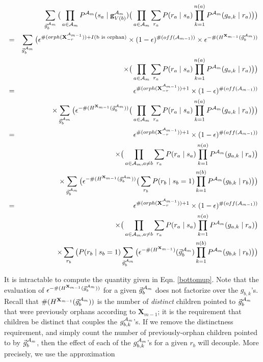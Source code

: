 \documentclass[11pt]{article}
\newcommand{\A}{{\cal A}}
\newcommand{\X}{\mathbf{X}}
\newcommand{\XrmPrev}{\X^{\A_{m-1}}_{-r}}
\newcommand{\Am}{\A_{m}}
\begin{document}
\begin{eqnarray}
& &\sum_{\vec{g}^{\Am}_{b}} \big( \prod_{a \in {\Am}} P^{\Am}(s_a \mid \mathbf{g}^{\Am}_{V({b})})  \big( \prod_{a \in {\A_{m}}} \sum_{r_a} P(r_a \mid s_a) \prod_{k=1}^{n(a)} P^{\Am}(g_{a,k} \mid r_a) \big) \big ) \\
%
&=& \sum_{\vec{g}^{\Am}_{b}} \big(\epsilon^{\#(orph(\XrmPrev)) + I(\text{b is orphan})} \times (1-\epsilon)^{\#(off(\A_{m-1}))} \times \epsilon^{- \#(H^{\X_{m-1}}(\vec{g}_b^{\Am}))}  \nonumber \\
& & \times \big( \prod_{a \in {\A_{m}}} \sum_{r_a} P(r_a \mid s_a) \prod_{k=1}^{n(a)} P^{\Am}(g_{a,k} \mid r_a) \big) \big) \\
%
&=& \epsilon^{\#(orph(\XrmPrev)) + 1} \times (1-\epsilon)^{\#(off(\A_{m-1}))} \nonumber \\
& & \times  \sum_{\vec{g}^{\Am}_{b}} \big( \epsilon^{- \#(H^{\X_{m-1}}(\vec{g}_b^{\Am}))}  \big( \prod_{a \in {\A_{m}}} \sum_{r_a} P(r_a \mid s_a) \prod_{k=1}^{n(a)} P^{\Am}(g_{a,k} \mid r_a) \big) \big) \\
%
&=& \epsilon^{\#(orph(\XrmPrev)) + 1} \times (1-\epsilon)^{\#(off(\A_{m-1}))} \nonumber \\
& &\times  \big( \prod_{a \in {\A_{m}}, a \neq b} \sum_{r_a} P(r_a \mid s_a) \prod_{k=1}^{n(a)} P^{\Am}(g_{a,k} \mid r_a) \big) \\
& & \times \sum_{\vec{g}^{\Am}_{b}} \big( \epsilon^{- \#(H^{\X_{m-1}}(\vec{g}_b^{\Am}))} \big( \sum_{r_b} P(r_b \mid s_b = 1) \prod_{k=1}^{n(b)} P^{\Am}(g_{b,k} \mid r_b) \big) \big) \nonumber \\
%
&=& \epsilon^{\#(orph(\XrmPrev)) + 1} \times (1-\epsilon)^{\#(off(\A_{m-1}))} \nonumber \\
& & \times \big( \prod_{a \in {\A_{m}}, a \neq b} \sum_{r_a} P(r_a \mid s_a) \prod_{k=1}^{n(a)} P^{\Am}(g_{a,k} \mid r_a) \big) \label{bottomup} \\
& & \times \sum_{r_b} \big(P(r_b \mid s_b = 1) \sum_{\vec{g}^{\Am}_{b}} \big( \epsilon^{-\#(H^{\X_{m-1}})}(\vec{g}^{\Am}_b) \prod_{k=1}^{n(b)} P^{\Am}(g_{b,k} \mid r_b) \big) \big) \nonumber
\end{eqnarray} 

It is intractable to compute the quantity given in Eqn. \ref{bottomup}. Note that the evaluation of $\epsilon^{-\#(H^{\X_{m-1}}(\vec{g}^{\Am}_b))}$ for a given $\vec{g}^{\Am}_{b}$ does not factorize over the $g_{b,k}$'s. Recall that $\#(H^{\X_{m-1}}(\vec{g}^{\Am}_b))$ is the number of \emph{distinct} children pointed to $\vec{g}^{\Am}_b$ that were previously orphans according to $\X_{m-1}$; it is the requirement that children be distinct that couples the $g^{\Am}_{b,k}$'s. If we remove the distinctness requirement, and simply count the number of previously-orphan children pointed to by $\vec{g}^{\Am}_b$, then the effect of each of the $g^{\Am}_{b,k}$'s for a given $r_b$ will decouple. More precisely, we use the approximation
\end{document}
